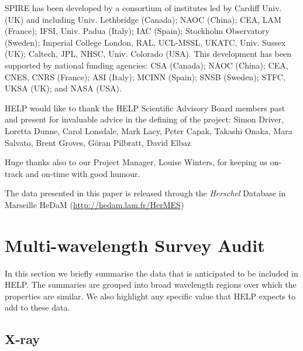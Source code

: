 \documentclass[usenatbib]{mnras}
\begin{document}
SPIRE has been developed by a consortium of institutes led by Cardiff Univ. (UK)
and including Univ. Lethbridge (Canada); NAOC (China); CEA, LAM (France); IFSI,
Univ. Padua (Italy); IAC (Spain); Stockholm Observatory (Sweden); Imperial
College London, RAL, UCL-MSSL, UKATC, Univ. Sussex (UK); Caltech, JPL, NHSC,
Univ. Colorado (USA). This development has been supported by national funding
agencies: CSA (Canada); NAOC (China); CEA, CNES, CNRS (France); ASI (Italy);
MCINN (Spain); SNSB (Sweden); STFC, UKSA (UK); and NASA (USA).

HELP would like to thank the HELP Scientific Advisory Board members past and
present for invaluable advice in the defining of the project: Simon Driver,
Loretta Dunne, Carol Lonsdale, Mark Lacy, Peter Capak, Takashi Onaka, Mara
Salvato, Brent Groves, G\"{o}ran Pilbratt, David Elbaz

Huge thanks also to our Project Manager, Louise Winters, for keeping us on-track
and on-time with good humour.

The data presented in this paper is released through the {\em Herschel} Database
in Marseille HeDaM ({\url{http://hedam.lam.fr/HerMES}})





\appendix




\section[Multi-wavelength Survey Audit\\{\color{red}Obsolete?}]{Multi-wavelength Survey Audit}

In this section we briefly summarise the data that is anticipated to be included
in HELP.   The summaries are grouped into broad wavelength regions over which
the properties are similar. We also highlight any specific value that HELP
expects to add to these data.

\subsection{X-ray}
\end{document}
